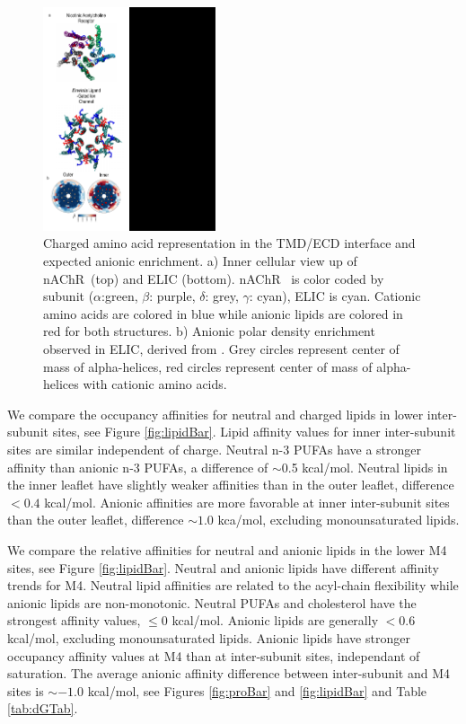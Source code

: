 \documentclass[preprint,3p,9pt,times,onecolumn]{elsarticle}
\newcommand{\nachr}{nAChR}
\begin{document}
\begin{figure}[!h]
	\center
	\includegraphics[width=2in]{Anonic_AA.pdf}
	\caption{Charged amino acid representation in the TMD/ECD interface and expected anionic enrichment. a) Inner cellular view up of \nachr~(top) and ELIC (bottom). \nachr~ is color coded by subunit ($\alpha$:green, $\beta$: purple, $\delta$: grey, $\gamma$: cyan), ELIC is cyan. Cationic amino acids are colored in blue while anionic lipids are colored in red for both structures. b) Anionic polar density enrichment observed in ELIC, derived from \cite{Tong2019}. Grey circles represent center of mass of alpha-helices, red circles represent center of mass of alpha-helices with cationic amino acids.}
	\label{fig:aaa}
\end{figure}

We compare the occupancy affinities for neutral and charged lipids in lower inter-subunit sites, see Figure \ref{fig:lipidBar}. Lipid affinity values for inner inter-subunit sites are similar independent of charge. Neutral n-3 PUFAs have a stronger affinity than anionic n-3 PUFAs, a difference of $\sim$0.5 kcal/mol. Neutral lipids in the inner leaflet have slightly weaker affinities than in the outer leaflet, difference $< 0.4$ kcal/mol. Anionic affinities are more favorable at inner inter-subunit sites than the outer leaflet, difference $\sim1.0$ kca/mol, excluding monounsaturated lipids.%

We compare the relative affinities for neutral and anionic lipids in the lower M4 sites, see Figure \ref{fig:lipidBar}. Neutral and anionic lipids have different affinity trends for M4. Neutral lipid affinities are related to the acyl-chain flexibility while anionic lipids are non-monotonic. Neutral PUFAs and cholesterol have the strongest affinity values, $\leq 0$ kcal/mol.  Anionic lipids are generally $<0.6$ kcal/mol, excluding monounsaturated lipids. Anionic lipids have stronger occupancy affinity values at M4 than at inter-subunit sites, independant of saturation. The average anionic affinity difference between inter-subunit and M4 sites is $\sim -1.0$ kcal/mol, see Figures \ref{fig:proBar} and \ref{fig:lipidBar} and Table \ref{tab:dGTab}. 
\end{document}
